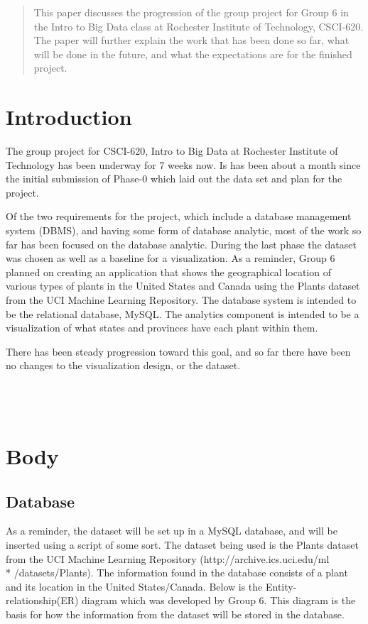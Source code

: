 \documentclass{Group6_Phase1}
\begin{document}
\maketitle
\begin{abstract}
This paper discusses the progression of the group project for Group 6 in the Intro to Big Data class at Rochester Institute of Technology, CSCI-620. The paper will further explain the work that has been done so far, what will be done in the future, and what the expectations are for the finished project. 
\end{abstract}


\section{Introduction}
The group project for CSCI-620, Intro to Big Data at Rochester Institute of Technology has been underway for 7 weeks now. Is has been about a month since the initial submission of Phase-0 which laid out the data set and plan for the project.

Of the two requirements for the project, which include a database management system (DBMS), and having some form of database analytic, most of the work so far has been focused on the database analytic. During the last phase the dataset was chosen as well as a baseline for a visualization. As a reminder, Group 6 planned on creating an application that shows the geographical location of various types of plants in the United States and Canada using the Plants dataset from the UCI Machine Learning Repository. The database system is intended to be the relational database, MySQL. The analytics component is intended to be a visualization of what states and provinces have each plant within them.

There has been steady progression toward this goal, and so far there have been no changes to the visualization design, or the dataset. 
\\\\\\\\

\section{Body}

\subsection{Database}
As a reminder, the dataset will be set up in a MySQL database, and will be inserted using a script of some sort. The dataset being used is the Plants dataset from the UCI Machine Learning Repository (http://archive.ics.uci.edu/ml \\* /datasets/Plants). The information found in the database consists of a plant and its location in the United States/Canada. Below is the Entity-relationship(ER) diagram which was developed by Group 6. This diagram is the basis for how the information from the dataset will be stored in the database. 
\end{document}
